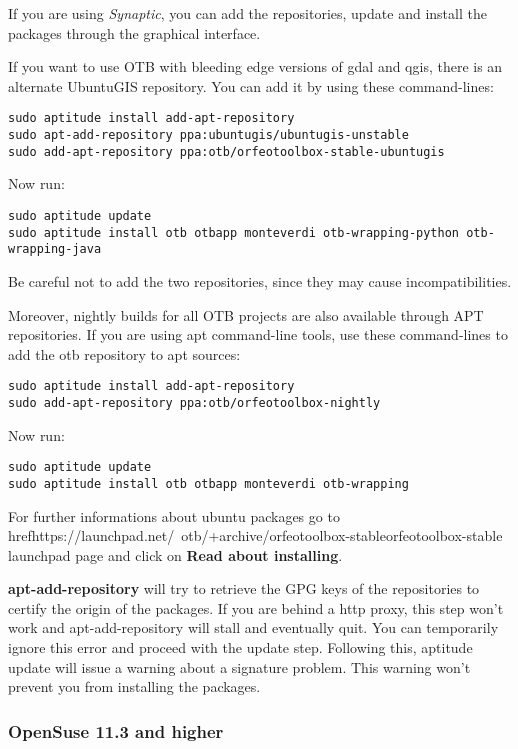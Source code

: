 If you are using \emph{Synaptic}, you can add the repositories, update and install the packages through the
graphical interface.

If you want to use OTB with bleeding edge versions of gdal and qgis, there is an alternate UbuntuGIS repository.
You can add it by using these command-lines:
\begin{verbatim}
sudo aptitude install add-apt-repository 
sudo apt-add-repository ppa:ubuntugis/ubuntugis-unstable
sudo add-apt-repository ppa:otb/orfeotoolbox-stable-ubuntugis
\end{verbatim}
Now run:
\begin{verbatim}
sudo aptitude update
sudo aptitude install otb otbapp monteverdi otb-wrapping-python otb-wrapping-java
\end{verbatim}

Be careful not to add the two repositories, since they may cause incompatibilities.

Moreover, nightly builds for all OTB projects are also available through APT repositories.
If you are using apt command-line tools, use these command-lines to add the otb repository to apt sources:
\begin{verbatim}
sudo aptitude install add-apt-repository 
sudo add-apt-repository ppa:otb/orfeotoolbox-nightly
\end{verbatim}
Now run:
\begin{verbatim}
sudo aptitude update
sudo aptitude install otb otbapp monteverdi otb-wrapping
\end{verbatim}

For further informations about ubuntu packages go to href{https://launchpad.net/~otb/+archive/orfeotoolbox-stable}{orfeotoolbox-stable launchpad page} and click on \textbf{Read about installing}.

\textbf{apt-add-repository} will try to retrieve the GPG keys of the repositories to certify the origin of the packages. If you are behind a http proxy, this step won't work and apt-add-repository will stall and eventually quit. You can temporarily ignore this error and proceed with the update step. Following this, aptitude update will issue a warning about a signature problem. This warning won't prevent you from installing the packages.

\subsubsection{OpenSuse 11.3 and higher}
\label{ssec:opensuse_binaries}

